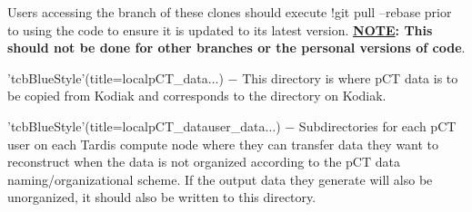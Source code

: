\begin{tcbenvironment}
\begin{tcbparagraph}
Users accessing the  branch of these clones should execute \tcbinlinebashbox!{git pull --rebase} prior to using the code to ensure it is updated to its latest version.  \textbf{\ul{NOTE}: This should not be done for other branches or the personal versions of code}.
\end{tcbparagraph}
\begin{tcbparagraph}'tcbBlueStyle'(title=\dirsep local\dirsep pCT\_data\dirsep$\dots$)
$\boldsymbol{-}$ This directory is where pCT data is to be copied from Kodiak and corresponds to the  directory on Kodiak.
\end{tcbparagraph}
\begin{tcbparagraph}'tcbBlueStyle'(title=\dirsep local\dirsep pCT\_data\dirsep user\_data\dirsep{}\dirsep$\dots$)
$\boldsymbol{-}$ Subdirectories for each pCT user on each Tardis compute node where they can transfer data they want to reconstruct when the data is not organized according to the pCT data naming/organizational scheme.  If the output data they generate will also be unorganized, it should also be written to this directory.\\\par


\end{tcbparagraph}
\end{tcbenvironment}
